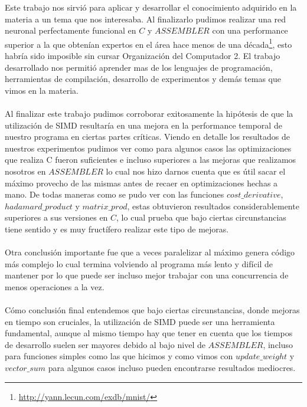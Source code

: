 
Este trabajo nos sirvió para aplicar y desarrollar el conocimiento adquirido en la materia a un tema que nos interesaba. Al finalizarlo pudimos realizar una red neuronal perfectamente funcional en $C$ y $ASSEMBLER$ con una performance superior a la que obtenían expertos en el área hace menos de una década\footnote{\url{http://yann.lecun.com/exdb/mnist/}}, esto habría sido imposible sin cursar Organización del Computador 2. El trabajo desarrollado nos permitió aprender mas de los lenguajes de programación, herramientas de compilación, desarrollo de experimentos y demás temas que vimos en la materia.
\\
\\
Al finalizar este trabajo pudimos corroborar exitosamente la hipótesis de que la utilización de SIMD resultaría en una mejora en la performance temporal de nuestro programa en ciertas partes críticas. Viendo en detalle los resultados de nuestros experimentos pudimos ver como para algunos casos las optimizaciones que realiza C fueron suficientes e incluso superiores a las mejoras que realizamos nosotros en $ASSEMBLER$ lo cual nos hizo darnos cuenta que es útil sacar el máximo provecho de las mismas antes de recaer en optimizaciones hechas a mano. De todas maneras como se pudo ver con las funciones $cost\_derivative$, $hadamard\_product$ y $matrix\_prod$, estas obtuvieron resultados considerablemente superiores a sus versiones en $C$, lo cual prueba que bajo ciertas circunstancias tiene sentido y es muy fructífero realizar este tipo de mejoras.
\\
\\
Otra conclusión importante fue que a veces paralelizar al máximo genera código más complejo lo cual termina volviendo al programa más lento y difícil de mantener por lo que puede ser incluso mejor trabajar con una concurrencia de menos operaciones a la vez.
\\
\\
Cómo conclusión final entendemos que bajo ciertas circunstancias, donde mejoras en tiempo son cruciales, la utilización de SIMD puede ser una herramienta fundamental, aunque al mismo tiempo hay que tener en cuenta que los tiempos de desarrollo suelen ser mayores debido al bajo nivel de $ASSEMBLER$, incluso para funciones simples como las que hicimos y como vimos con $update\_weight$ y $vector\_sum$ para algunos casos incluso pueden encontrarse resultados mediocres.